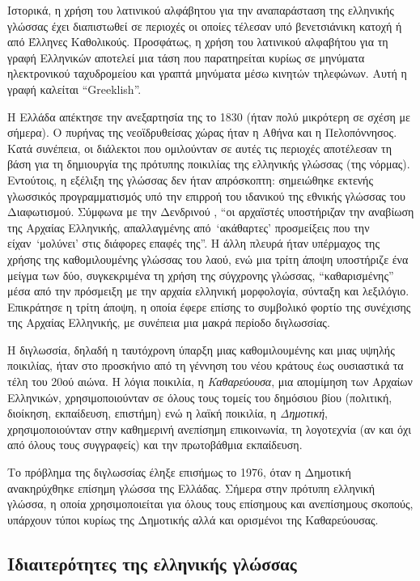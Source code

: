 \documentclass[]{../../metanetpaper}
\begin{document}
\begin{multicols}{2}
Ιστορικά, η χρήση του λατινικού αλφάβητου για την αναπαράσταση της ελληνικής γλώσσας έχει διαπιστωθεί σε περιοχές οι οποίες τέλεσαν υπό βενετσιάνικη κατοχή ή από Έλληνες Καθολικούς. Προσφάτως, η χρήση του λατινικού αλφαβήτου για τη γραφή Ελληνικών αποτελεί μια τάση που παρατηρείται κυρίως σε μηνύματα ηλεκτρονικού ταχυδρομείου και γραπτά μηνύματα μέσω κινητών τηλεφώνων. Αυτή η γραφή καλείται “Greeklish”.
\columnbreak


Η Ελλάδα απέκτησε την ανεξαρτησία της το 1830 (ήταν πολύ μικρότερη σε σχέση με σήμερα). Ο πυρήνας της νεοϊδρυθείσας χώρας ήταν η Αθήνα και η Πελοπόννησος. Κατά συνέπεια, οι διάλεκτοι που ομιλούνταν σε αυτές τις περιοχές αποτέλεσαν τη βάση για τη δημιουργία της πρότυπης ποικιλίας της ελληνικής γλώσσας (της νόρμας).  Εντούτοις, η εξέλιξη της γλώσσας δεν ήταν απρόσκοπτη: σημειώθηκε εκτενής γλωσσικός προγραμματισμός υπό την επιρροή του ιδανικού της εθνικής γλώσσας του Διαφωτισμού. Σύμφωνα με την Δενδρινού \cite{Dend1}, “οι αρχαϊστές υποστήριζαν την αναβίωση της Αρχαίας Ελληνικής, απαλλαγμένης από~`ακάθαρτες' προσμείξεις που την είχαν~`μολύνει' στις διάφορες επαφές της”. Η άλλη πλευρά ήταν υπέρμαχος της χρήσης της καθομιλουμένης γλώσσας του λαού, ενώ μια τρίτη άποψη υποστήριζε ένα μείγμα των δύο, συγκεκριμένα τη χρήση της σύγχρονης γλώσσας, “καθαρισμένης” μέσα από την πρόσμειξη με την αρχαία ελληνική μορφολογία, σύνταξη και λεξιλόγιο. Επικράτησε η τρίτη άποψη, η οποία έφερε επίσης το συμβολικό φορτίο της συνέχισης της Αρχαίας Ελληνικής, με συνέπεια μια μακρά περίοδο διγλωσσίας.

Η διγλωσσία, δηλαδή η ταυτόχρονη ύπαρξη μιας καθομιλουμένης και μιας υψηλής ποικιλίας, ήταν στο προσκήνιο από τη γέννηση του νέου κράτους έως ουσιαστικά τα τέλη του 20ού αιώνα. Η λόγια ποικιλία, η  \textit{Καθαρεύουσα}, μια απομίμηση των Αρχαίων Ελληνικών, χρησιμοποιούνταν σε όλους τους τομείς του δημόσιου βίου (πολιτική, διοίκηση, εκπαίδευση, επιστήμη) ενώ η λαϊκή ποικιλία, η  \textit{Δημοτική}, χρησιμοποιούνταν στην καθημερινή ανεπίσημη επικοινωνία, τη λογοτεχνία (αν και όχι από όλους τους συγγραφείς) και την πρωτοβάθμια εκπαίδευση.

Το πρόβλημα της διγλωσσίας έληξε επισήμως το 1976, όταν η Δημοτική ανακηρύχθηκε επίσημη γλώσσα της Ελλάδας. Σήμερα στην πρότυπη ελληνική γλώσσα, η οποία χρησιμοποιείται για όλους τους επίσημους και ανεπίσημους σκοπούς, υπάρχουν τύποι κυρίως της Δημοτικής αλλά και ορισμένοι της Καθαρεύουσας.

\subsection{Ιδιαιτερότητες της ελληνικής γλώσσας}


\end{multicols}
\end{document}
